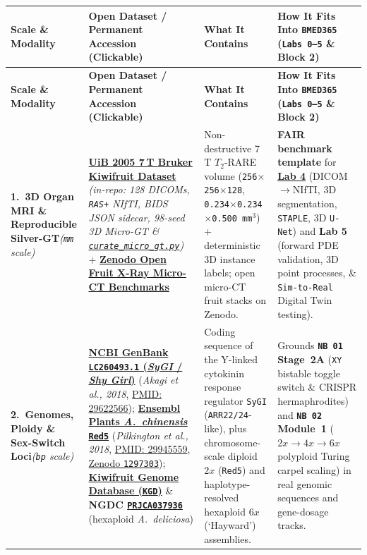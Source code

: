 \documentclass[10pt,a4paper]{article}
\newcommand{\ghblob}{https://github.com/arvidl/BMED365-2027/blob/main}
\newcommand{\ghtree}{https://github.com/arvidl/BMED365-2027/tree/main}
\begin{document}
{\footnotesize
\renewcommand{\arraystretch}{1.12}
\begin{xltabular}{\textwidth}{L{2.55cm} L{4.85cm} L{4.25cm} Y}
\toprule
{}\textbf{Scale \& Modality} & \textbf{Open Dataset / Permanent Accession (Clickable)} & \textbf{What It Contains} & \textbf{How It Fits Into \texttt{BMED365} (\texttt{Labs 0--5} \& Block 2)} \\
\midrule
\endfirsthead
\toprule
{}\textbf{Scale \& Modality} & \textbf{Open Dataset / Permanent Accession (Clickable)} & \textbf{What It Contains} & \textbf{How It Fits Into \texttt{BMED365} (\texttt{Labs 0--5} \& Block 2)} \\
\midrule
\endhead
\bottomrule
\endfoot
\textbf{1.\ 3D Organ MRI \& Reproducible Silver-GT}\newline \textit{(\texttt{mm} scale)} &
\href{\ghtree/Lab4-Comp-Imag/Kiwi-challenge/data}{\textbf{UiB 2005 7\,T Bruker Kiwifruit Dataset}} \textit{(in-repo: 128 DICOMs, \texttt{RAS+} NIfTI, BIDS JSON sidecar, 98-seed 3D Micro-GT \& \href{\ghblob/Lab4-Comp-Imag/Kiwi-challenge/scripts/curate_micro_gt.py}{\texttt{curate\_micro\_gt.py}})} + \href{https://zenodo.org/search?q=fruit+micro-CT}{\textbf{Zenodo Open Fruit X-Ray Micro-CT Benchmarks}} &
Non-destructive 7\,T $T_2$-RARE volume (\texttt{256$\times$256$\times$128}, \texttt{0.234$\times$0.234$\times$0.500\,mm$^3$}) + deterministic 3D instance labels; open micro-CT fruit stacks on Zenodo. &
\textbf{FAIR benchmark template} for \href{\ghblob/Lab4-Comp-Imag/Kiwi-challenge/README.md}{\textbf{Lab 4}} (DICOM$\to$NIfTI, 3D segmentation, \texttt{STAPLE}, 3D \texttt{U-Net}) and \textbf{Lab 5} (forward PDE validation, 3D point processes, \& \texttt{Sim-to-Real} Digital Twin testing). \\

\textbf{2.\ Genomes, Ploidy \& Sex-Switch Loci}\newline \textit{(\texttt{bp} scale)} &
\href{https://www.ncbi.nlm.nih.gov/nuccore/LC260493.1}{\textbf{NCBI GenBank \texttt{LC260493.1} (\textit{SyGI} / \textit{Shy Girl})}} (\textit{Akagi et al., 2018}, \href{https://pubmed.ncbi.nlm.nih.gov/29622566/}{PMID: 29622566}); \href{https://plants.ensembl.org/Actinidia_chinensis/Info/Index}{\textbf{Ensembl Plants \textit{A.\ chinensis} \texttt{Red5}}} (\textit{Pilkington et al., 2018}, \href{https://pubmed.ncbi.nlm.nih.gov/29945559/}{PMID: 29945559}, \href{https://zenodo.org/records/1297303}{Zenodo \texttt{1297303}}); \href{http://kiwifruitgenome.org/}{\textbf{Kiwifruit Genome Database (\texttt{KGD})}} \& \textbf{NGDC \href{https://ngdc.cncb.ac.cn/bioproject/browse/PRJCA037936}{\texttt{PRJCA037936}}} (hexaploid \textit{A.\ deliciosa}) &
Coding sequence of the Y-linked cytokinin response regulator \texttt{SyGI} (\texttt{ARR22/24}-like), plus chromosome-scale diploid $2x$ (\texttt{Red5}) and haplotype-resolved hexaploid $6x$ (`Hayward') assemblies. &
Grounds \textbf{\texttt{NB 01} Stage~2A} (\texttt{XY} bistable toggle switch \& CRISPR hermaphrodites) and \textbf{\texttt{NB 02} Module~1} ($2x \to 4x \to 6x$ polyploid Turing carpel scaling) in real genomic sequences and gene-dosage tracks. \\


\end{xltabular}}
\end{document}
